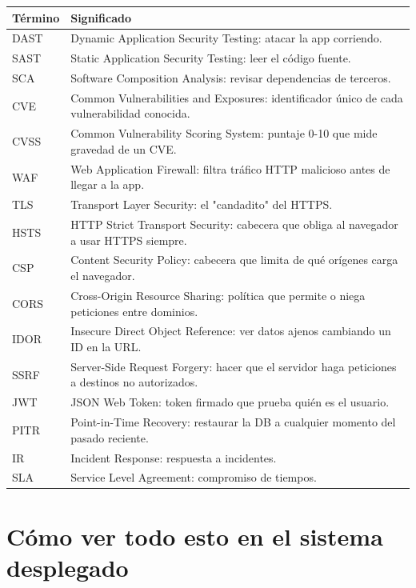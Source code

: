 \documentclass[12pt,a4paper,oneside]{article}
\begin{document}
\begin{table}[h]
\centering
\small
\begin{tabularx}{\textwidth}{lX}
\toprule
\textbf{Término} & \textbf{Significado} \\
\midrule
DAST & Dynamic Application Security Testing: atacar la app corriendo. \\
SAST & Static Application Security Testing: leer el código fuente. \\
SCA & Software Composition Analysis: revisar dependencias de terceros. \\
CVE & Common Vulnerabilities and Exposures: identificador único de cada vulnerabilidad conocida. \\
CVSS & Common Vulnerability Scoring System: puntaje 0-10 que mide gravedad de un CVE. \\
WAF & Web Application Firewall: filtra tráfico HTTP malicioso antes de llegar a la app. \\
TLS & Transport Layer Security: el "candadito" del HTTPS. \\
HSTS & HTTP Strict Transport Security: cabecera que obliga al navegador a usar HTTPS siempre. \\
CSP & Content Security Policy: cabecera que limita de qué orígenes carga el navegador. \\
CORS & Cross-Origin Resource Sharing: política que permite o niega peticiones entre dominios. \\
IDOR & Insecure Direct Object Reference: ver datos ajenos cambiando un ID en la URL. \\
SSRF & Server-Side Request Forgery: hacer que el servidor haga peticiones a destinos no autorizados. \\
JWT & JSON Web Token: token firmado que prueba quién es el usuario. \\
PITR & Point-in-Time Recovery: restaurar la DB a cualquier momento del pasado reciente. \\
IR & Incident Response: respuesta a incidentes. \\
SLA & Service Level Agreement: compromiso de tiempos. \\
\bottomrule
\end{tabularx}
\end{table}

\section{Cómo ver todo esto en el sistema desplegado}
\end{document}
